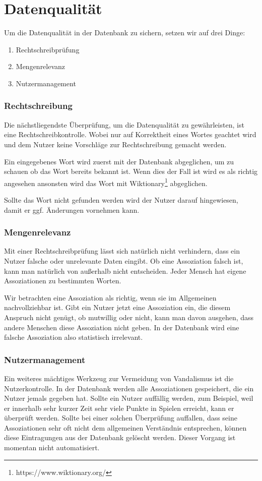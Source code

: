 \section{Datenqualität}
Um die Datenqualität  in der Datenbank zu sichern, setzen wir auf drei Dinge:

\begin{enumerate}
	\item Rechtschreibprüfung
	\item Mengenrelevanz
	\item Nutzermanagement
\end{enumerate}

\subsubsection{Rechtschreibung}
Die nächstliegendste Überprüfung, um die Datenqualität zu gewährleisten, ist eine
Rechtschreibkontrolle. Wobei nur auf Korrektheit eines Wortes geachtet wird und dem Nutzer keine Vorschläge zur Rechtschreibung gemacht werden.

Ein eingegebenes Wort wird zuerst mit der Datenbank abgeglichen, um zu schauen ob das Wort bereits bekannt ist. Wenn dies der Fall ist wird es als richtig angesehen ansonsten wird das Wort mit Wiktionary\footnote{https://www.wiktionary.org/} abgeglichen.

Sollte das Wort nicht gefunden werden wird der Nutzer darauf hingewiesen, damit er ggf. Änderungen vornehmen kann.

\subsubsection{Mengenrelevanz}
Mit einer Rechtschreibprüfung lässt sich natürlich nicht verhindern, dass ein
Nutzer falsche oder unrelevante Daten eingibt. Ob eine Assoziation falsch ist,
kann man natürlich von außerhalb nicht entscheiden. Jeder Mensch hat eigene
Assoziationen zu bestimmten Worten.

Wir betrachten eine Assoziation als richtig, wenn sie im Allgemeinen
nachvollziehbar ist. Gibt ein Nutzer jetzt eine Assoziation ein, die diesem
Anspruch nicht genügt, ob mutwillig oder nicht, kann man davon ausgehen, dass
andere Menschen diese Assoziation nicht geben. In der Datenbank wird eine
falsche Assoziation also statistisch irrelevant.

\subsubsection{Nutzermanagement}
Ein weiteres mächtiges Werkzeug zur Vermeidung von Vandalismus ist die
Nutzerkontrolle. In der Datenbank werden alle Assoziationen gespeichert, die
ein Nutzer jemals gegeben hat. Sollte ein Nutzer auffällig werden, zum
Beispiel, weil er innerhalb sehr kurzer Zeit sehr viele Punkte in Spielen
erreicht, kann er überprüft werden. Sollte bei einer solchen Überprüfung
auffallen, dass seine Assoziationen sehr oft nicht dem allgemeinen Verständnis
entsprechen, können diese Eintragungen aus der Datenbank gelöscht werden.
Dieser Vorgang ist momentan nicht automatisiert.
